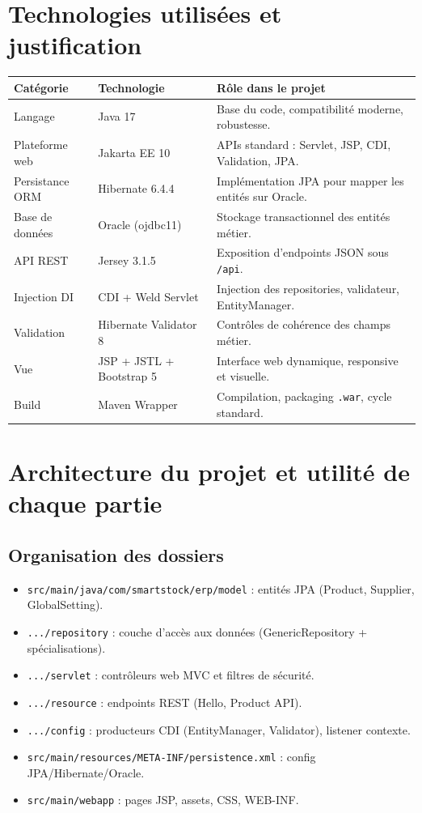 \documentclass[12pt,a4paper]{report}
\begin{document}
\chapter{Technologies utilis\'ees et justification}

\begin{tabularx}{\textwidth}{@{}l l X@{}}
\toprule
\textbf{Cat\'egorie} & \textbf{Technologie} & \textbf{R\^ole dans le projet} \\
\midrule
Langage & Java 17 & Base du code, compatibilit\'e moderne, robustesse. \\
Plateforme web & Jakarta EE 10 & APIs standard : Servlet, JSP, CDI, Validation, JPA. \\
Persistance ORM & Hibernate 6.4.4 & Impl\'ementation JPA pour mapper les entit\'es sur Oracle. \\
Base de donn\'ees & Oracle (ojdbc11) & Stockage transactionnel des entit\'es m\'etier. \\
API REST & Jersey 3.1.5 & Exposition d'endpoints JSON sous \texttt{/api}. \\
Injection DI & CDI + Weld Servlet & Injection des repositories, validateur, EntityManager. \\
Validation & Hibernate Validator 8 & Contr\^oles de coh\'erence des champs m\'etier. \\
Vue & JSP + JSTL + Bootstrap 5 & Interface web dynamique, responsive et visuelle. \\
Build & Maven Wrapper & Compilation, packaging \texttt{.war}, cycle standard. \\
\bottomrule
\end{tabularx}

\chapter{Architecture du projet et utilit\'e de chaque partie}

\section{Organisation des dossiers}
\begin{itemize}[leftmargin=1.2cm]
    \item \texttt{src/main/java/com/smartstock/erp/model} : entit\'es JPA (Product, Supplier, GlobalSetting).
    \item \texttt{.../repository} : couche d'acc\`es aux donn\'ees (GenericRepository + sp\'ecialisations).
    \item \texttt{.../servlet} : contr\^oleurs web MVC et filtres de s\'ecurit\'e.
    \item \texttt{.../resource} : endpoints REST (Hello, Product API).
    \item \texttt{.../config} : producteurs CDI (EntityManager, Validator), listener contexte.
    \item \texttt{src/main/resources/META-INF/persistence.xml} : config JPA/Hibernate/Oracle.
    \item \texttt{src/main/webapp} : pages JSP, assets, CSS, WEB-INF.
\end{itemize}
\end{document}
